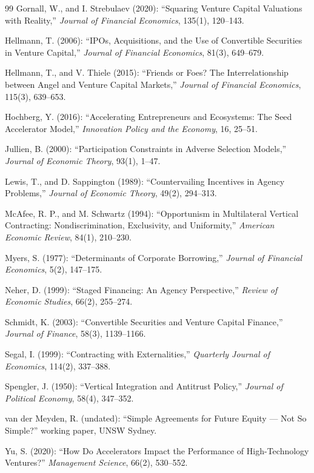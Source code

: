 \documentclass[11pt]{article}
\theoremstyle{definition}
\begin{document}
\begin{thebibliography}{99}
 Gornall, W., and I. Strebulaev (2020): ``Squaring Venture Capital Valuations with Reality,'' \emph{Journal of Financial Economics}, 135(1), 120--143.

 Hellmann, T. (2006): ``IPOs, Acquisitions, and the Use of Convertible Securities in Venture Capital,'' \emph{Journal of Financial Economics}, 81(3), 649--679.

 Hellmann, T., and V. Thiele (2015): ``Friends or Foes? The Interrelationship between Angel and Venture Capital Markets,'' \emph{Journal of Financial Economics}, 115(3), 639--653.

 Hochberg, Y. (2016): ``Accelerating Entrepreneurs and Ecosystems: The Seed Accelerator Model,'' \emph{Innovation Policy and the Economy}, 16, 25--51.

 Jullien, B. (2000): ``Participation Constraints in Adverse Selection Models,'' \emph{Journal of Economic Theory}, 93(1), 1--47.

 Lewis, T., and D. Sappington (1989): ``Countervailing Incentives in Agency Problems,'' \emph{Journal of Economic Theory}, 49(2), 294--313.

 McAfee, R. P., and M. Schwartz (1994): ``Opportunism in Multilateral Vertical Contracting: Nondiscrimination, Exclusivity, and Uniformity,'' \emph{American Economic Review}, 84(1), 210--230.

 Myers, S. (1977): ``Determinants of Corporate Borrowing,'' \emph{Journal of Financial Economics}, 5(2), 147--175.

 Neher, D. (1999): ``Staged Financing: An Agency Perspective,'' \emph{Review of Economic Studies}, 66(2), 255--274.

 Schmidt, K. (2003): ``Convertible Securities and Venture Capital Finance,'' \emph{Journal of Finance}, 58(3), 1139--1166.

 Segal, I. (1999): ``Contracting with Externalities,'' \emph{Quarterly Journal of Economics}, 114(2), 337--388.

 Spengler, J. (1950): ``Vertical Integration and Antitrust Policy,'' \emph{Journal of Political Economy}, 58(4), 347--352.

 van der Meyden, R. (undated): ``Simple Agreements for Future Equity --- Not So Simple?'' working paper, UNSW Sydney.

 Yu, S. (2020): ``How Do Accelerators Impact the Performance of High-Technology Ventures?'' \emph{Management Science}, 66(2), 530--552.

\end{thebibliography}
\end{document}
